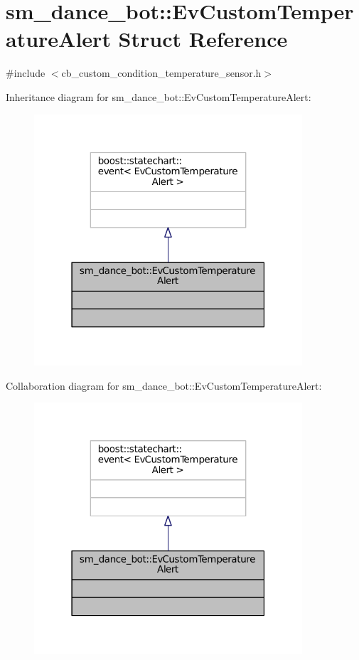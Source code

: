 \hypertarget{structsm__dance__bot_1_1EvCustomTemperatureAlert}{}\section{sm\+\_\+dance\+\_\+bot\+:\+:Ev\+Custom\+Temperature\+Alert Struct Reference}
\label{structsm__dance__bot_1_1EvCustomTemperatureAlert}


{\ttfamily \#include $<$cb\+\_\+custom\+\_\+condition\+\_\+temperature\+\_\+sensor.\+h$>$}



Inheritance diagram for sm\+\_\+dance\+\_\+bot\+:\+:Ev\+Custom\+Temperature\+Alert\+:
\nopagebreak
\begin{figure}[H]
\begin{center}
\leavevmode
\includegraphics[width=283pt]{structsm__dance__bot_1_1EvCustomTemperatureAlert__inherit__graph}
\end{center}
\end{figure}


Collaboration diagram for sm\+\_\+dance\+\_\+bot\+:\+:Ev\+Custom\+Temperature\+Alert\+:
\nopagebreak
\begin{figure}[H]
\begin{center}
\leavevmode
\includegraphics[width=283pt]{structsm__dance__bot_1_1EvCustomTemperatureAlert__coll__graph}
\end{center}
\end{figure}


